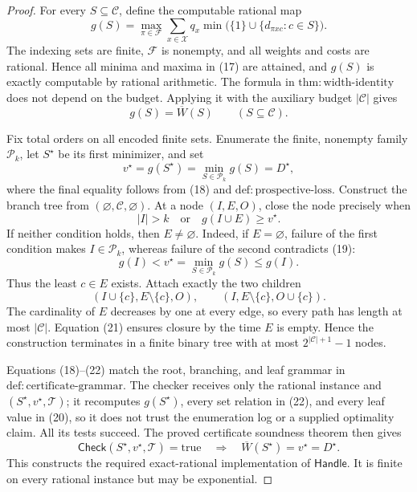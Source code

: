 \documentclass{article}
\begin{document}
\begin{proof}
For every \(S\subseteq\mathcal C\), define the computable rational map
\[
g(S)=\max_{\pi\in\mathcal F}\sum_{x\in\mathcal X}q_x
\min\bigl(\{1\}\cup\{d_{\pi xc}:c\in S\}\bigr).                     \tag{17}
\]
The indexing sets are finite, \(\mathcal F\) is nonempty, and all weights
and costs are rational.  Hence all minima and maxima in (17) are attained,
and \(g(S)\) is exactly computable by rational arithmetic.  The formula in
\(\mathrm{thm{:}width\text{-}identity}\) does not depend on the budget.
Applying it with the auxiliary budget \(|\mathcal C|\) gives
\[
g(S)=\overline W(S)\qquad(S\subseteq\mathcal C).                       \tag{18}
\]

Fix total orders on all encoded finite sets.  Enumerate the finite,
nonempty family \(\mathcal P_k\), let \(S^\star\) be its first minimizer,
and set
\[
v^\star=g(S^\star)=\min_{S\in\mathcal P_k}g(S)=D^\star,               \tag{19}
\]
where the final equality follows from (18) and
\(\mathrm{def{:}prospective\text{-}loss}\).  Construct the branch tree
from \((\varnothing,\mathcal C,\varnothing)\).  At a node \((I,E,O)\),
close the node precisely when
\[
|I|>k
\quad\text{or}\quad
g(I\cup E)\geq v^\star.                                                \tag{20}
\]
If neither condition holds, then \(E\neq\varnothing\).  Indeed, if
\(E=\varnothing\), failure of the first condition makes
\(I\in\mathcal P_k\), whereas failure of the second contradicts (19):
\[
g(I)<v^\star=\min_{S\in\mathcal P_k}g(S)\leq g(I).                    \tag{21}
\]
Thus the least \(c\in E\) exists.  Attach exactly the two children
\[
(I\cup\{c\},E\setminus\{c\},O),
\qquad
(I,E\setminus\{c\},O\cup\{c\}).                                     \tag{22}
\]
The cardinality of \(E\) decreases by one at every edge, so every path has
length at most \(|\mathcal C|\).  Equation (21) ensures closure by the time
\(E\) is empty.  Hence the construction terminates in a finite binary tree
with at most \(2^{|\mathcal C|+1}-1\) nodes.

Equations (18)--(22) match the root, branching, and leaf grammar in
\(\mathrm{def{:}certificate\text{-}grammar}\).  The checker receives only
the rational instance and \((S^\star,v^\star,\mathcal T)\); it recomputes
\(g(S^\star)\), every set relation in (22), and every leaf value in (20),
so it does not trust the enumeration log or a supplied optimality claim.
All its tests succeed.  The proved certificate soundness theorem then gives
\[
\mathsf{Check}(S^\star,v^\star,\mathcal T)=\mathrm{true}
\quad\Longrightarrow\quad
\overline W(S^\star)=v^\star=D^\star.                                 \tag{23}
\]
This constructs the required exact-rational implementation of
\(\mathsf{Handle}\).  It is finite on every rational instance but may be
exponential.


\end{proof}
\end{document}
